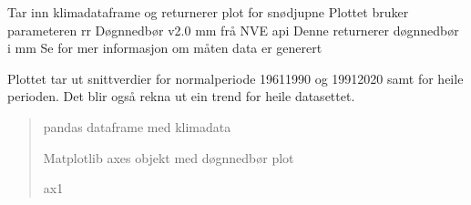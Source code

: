 \documentclass[letterpaper,10pt,norsk]{sphinxmanual}
\begin{document}
\begin{fulllineitems}
\label{\detokenize{index:klimadata.plot.plot_aarsnedbor}}
\pysigstartsignatures
{}
\pysigstopsignatures
\sphinxAtStartPar
Tar inn klimadataframe og returnerer plot for snødjupne
Plottet bruker parameteren rr \sphinxhyphen{} Døgnnedbør v2.0 \sphinxhyphen{} mm frå NVE api
Denne returnerer døgnnedbør i mm
Se  for mer informasjon om måten data er generert

\sphinxAtStartPar
Plottet tar ut snittverdier for normalperiode 1961\sphinxhyphen{}1990 og 1991\sphinxhyphen{}2020 samt for heile perioden.
Det blir også rekna ut ein trend for heile datasettet.
\begin{quote}\begin{description}
\sphinxAtStartPar
{} \textendash{} pandas dataframe med klimadata

\sphinxAtStartPar
Matplotlib axes objekt med døgnnedbør plot

\sphinxAtStartPar
ax1

\end{description}\end{quote}

\end{fulllineitems}

\end{document}
